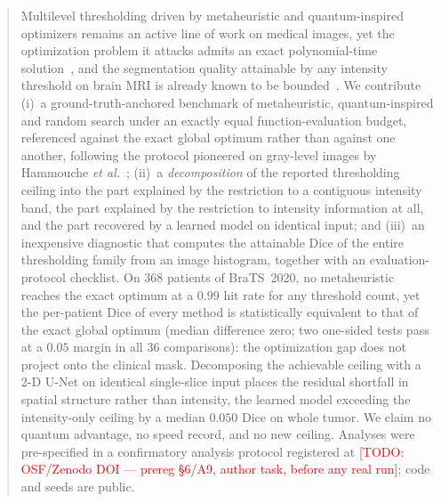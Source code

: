 \documentclass[journal]{IEEEtran}
\newcommand{\TODO}[1]{\textcolor{red}{[TODO: #1]}}
\theoremstyle{plain}
\theoremstyle{definition}
\begin{document}
\begin{abstract}
Multilevel thresholding driven by metaheuristic and quantum-inspired optimizers
remains an active line of work on medical images, yet the optimization problem
it attacks admits an exact polynomial-time solution~\cite{menotti_ciarp}, and
the segmentation quality attainable by any intensity threshold on brain MRI is
already known to be bounded~\cite{francois_jmiv}.
We contribute (i)~a ground-truth-anchored benchmark of metaheuristic, quantum-inspired
and random search under an exactly equal function-evaluation budget, referenced
against the exact global optimum rather than against one another, following the
protocol pioneered on gray-level images by Hammouche \emph{et al.}~\cite{hammouche_eaai};
(ii)~a \emph{decomposition} of the reported thresholding ceiling into the part
explained by the restriction to a contiguous intensity band, the part explained
by the restriction to intensity information at all, and the part recovered by a
learned model on identical input; and (iii)~an inexpensive diagnostic that
computes the attainable Dice of the entire thresholding family from an image
histogram, together with an evaluation-protocol checklist.
On $368$ patients of BraTS~2020, no metaheuristic reaches the exact optimum at a
$0.99$ hit rate for any threshold count, yet the per-patient Dice of every method
is statistically equivalent to that of the exact global optimum (median
difference zero; two one-sided tests pass at a $0.05$ margin in all $36$
comparisons): the optimization gap does not project onto the clinical mask.
Decomposing the achievable ceiling with a 2-D U-Net on identical single-slice
input places the residual shortfall in spatial structure rather than intensity,
the learned model exceeding the intensity-only ceiling by a median $0.050$ Dice
on whole tumor. We claim no quantum advantage, no speed record, and no new
ceiling.
Analyses were pre-specified in a confirmatory analysis protocol registered at
\TODO{OSF/Zenodo DOI --- prereg §6/A9, author task, before any real run};
code and seeds are public.
\end{abstract}
\end{document}
